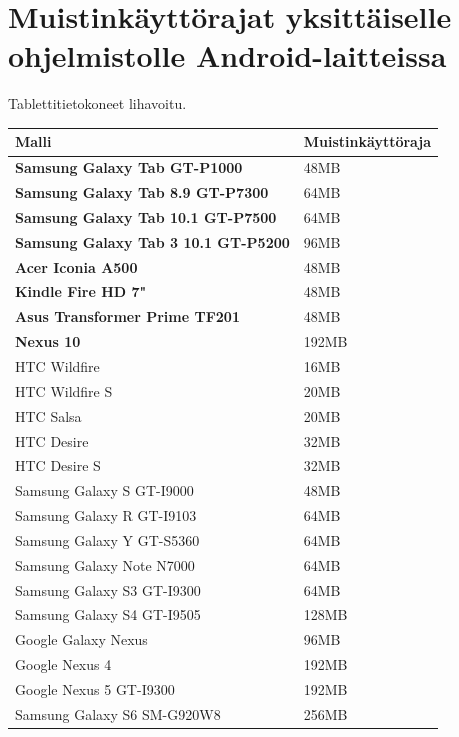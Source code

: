 \documentclass[utf8]{gradu3}
\begin{document}
\section{Muistinkäyttörajat yksittäiselle ohjelmistolle Android-laitteissa}

Tablettitietokoneet lihavoitu.

\begin{center}
    \begin{tabular}{| l | l |}
    \hline
    \textbf{Malli} & \textbf{Muistinkäyttöraja} \\ \hline
    \textbf{Samsung Galaxy Tab GT-P1000} & 48MB  \\ \hline
    \textbf{Samsung Galaxy Tab 8.9 GT-P7300} & 64MB \\ \hline
    \textbf{Samsung Galaxy Tab 10.1 GT-P7500} & 64MB \\ \hline
    \textbf{Samsung Galaxy Tab 3 10.1 GT-P5200} & 96MB \\ \hline
    \textbf{Acer Iconia A500} & 48MB \\ \hline
    \textbf{Kindle Fire HD 7"} & 48MB \\ \hline
    \textbf{Asus Transformer Prime TF201} & 48MB \\ \hline
    \textbf{Nexus 10} & 192MB \\ \hline
    HTC Wildfire & 16MB \\ \hline
    HTC Wildfire S & 20MB \\ \hline
    HTC Salsa & 20MB \\ \hline
    HTC Desire & 32MB \\ \hline
    HTC Desire S & 32MB \\ \hline
    Samsung Galaxy S GT-I9000 & 48MB \\ \hline
    Samsung Galaxy R GT-I9103 & 64MB \\ \hline
    Samsung Galaxy Y GT-S5360 & 64MB \\ \hline
    Samsung Galaxy Note N7000 & 64MB \\ \hline
    Samsung Galaxy S3 GT-I9300 & 64MB \\ \hline
    Samsung Galaxy S4 GT-I9505 & 128MB \\ \hline
    Google Galaxy Nexus & 96MB \\ \hline
    Google Nexus 4 & 192MB \\ \hline
    Google Nexus 5 GT-I9300 & 192MB \\ \hline
    Samsung Galaxy S6 SM-G920W8 & 256MB \\ \hline
    \end{tabular}
\end{center}
\end{document}
